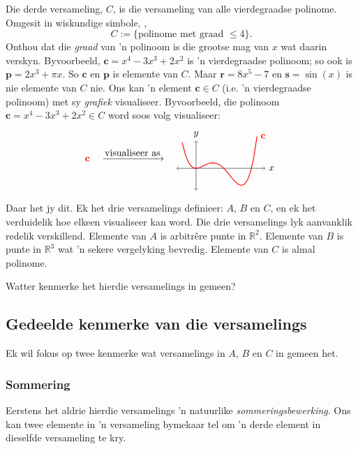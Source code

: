 \documentclass[a4paper,11pt]{book}
\theoremstyle{definition}
\newcommand{\be}{\begin{equation}}
\newcommand{\ee}{\end{equation}}
\newcommand{\ve}[1]{\mathbf{#1}}
\begin{document}
Die derde versameling, $C$, is die versameling van alle vierdegraadse
polinome. Omgesit in wiskundige simbole, ,
\be
C := \{ \mbox{polinome met graad $\leq 4$}\}.
\ee
Onthou dat die \emph{graad} van 'n polinoom is die grootse mag van $x$ wat
daarin verskyn.  Byvoorbeeld, $\ve{c} = x^4 - 3 x^3 + 2x^2$ is
'n vierdegraadse polinoom; so ook is $\ve{p} = 2x^3 + \pi x$. So $\ve{c}$
en $\ve{p}$ is elemente van $C$. Maar $\ve{r} = 8x^5 - 7$ en $\ve{s} =
\sin(x)$ is nie elemente van $C$ nie. Ons kan 'n element $\ve{c} \in C$
(i.e. 'n vierdegraadse polinoom) met sy \emph{grafiek} visualiseer.
Byvoorbeeld, die polinoom $\ve{c} = x^4 - 3x^3 + 2x^2 \in C$ word soos volg
visualiseer:
\begin{align*}
{\color{red} \ve{c}} \quad \xrightarrow{\mbox{visualiseer as}} \quad
\begin{tikzpicture}[baseline={([yshift=-.5ex]current bounding box.center)},vertex/.style={anchor=base,
	circle,fill=black!25,minimum size=18pt,inner sep=2pt},domain=-0.5:2.2]
\draw[<->] (-0.7, 0) -- (2.5,0) node[right] {$x$};
\draw[<->] (0, -0.8) -- (0, 1) node[above] {$y$};    
\draw[color=red, thick] plot[id=p]  (\x, {(\x-2)*\x*\x*(\x-1)}) 
node[right] {$\ve{c}$};
\end{tikzpicture}
\end{align*}

Daar het jy dit. Ek het drie versamelings definieer: $A$, $B$ en $C$, en ek
het verduidelik hoe elkeen visualiseer kan word. Die drie versamelings lyk
aanvanklik redelik verskillend. Elemente van $A$ is arbitr{\^e}re punte in
$\mathbb{R}^2$. Elemente van $B$ is punte in $\mathbb{R}^3$ wat 'n sekere
vergelyking bevredig. Elemente van $C$ is almal polinome.

Watter kenmerke het hierdie versamelings in gemeen?

\subsection{Gedeelde kenmerke van die versamelings}
Ek wil fokus op twee kenmerke wat versamelings in $A$, $B$ en $C$ in gemeen
het.

\subsubsection{Sommering}

Eerstens het aldrie hierdie versamelings 'n natuurlike
\emph{sommeringsbewerking}. Ons kan twee elemente in 'n versameling
bymekaar tel om 'n derde element in dieselfde versameling te kry.
\end{document}
